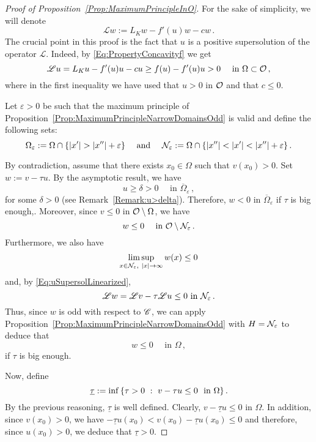 \begin{proof}[Proof of Proposition~\ref{Prop:MaximumPrincipleInO}]
    


	For the sake of simplicity, we will denote 
	$$
	\mathscr{L} w := L_K w - f'(u)w - cw\,.
	$$
	The crucial point in this proof is the fact that $u$ is a positive supersolution of the operator $\mathscr{L}$. Indeed, by \eqref{Eq:PropertyConcavityf} we get
	\begin{equation}
	\label{Eq:uSupersolLinearized}
	\mathscr{L} u = L_K u - f'(u)u - cu \geq f(u) - f'(u)u > 0 \quad \textrm{ in } \Omega \subset \mathcal{O}\,,
	\end{equation}
	where in the first inequality we have used that $u>0$ in $\mathcal{O}$ and that $c\leq 0$.
	
	Let $\varepsilon > 0$ be such that the maximum principle of Proposition~\ref{Prop:MaximumPrincipleNarrowDomainsOdd} is valid and define the following sets:
	$$
	\Omega_\varepsilon := \Omega \cap \{|x'| > |x''| + \varepsilon\}\quad \textrm{ and } \quad 
	\mathcal{N}_\varepsilon := \Omega \cap \{|x''| < |x'| < |x''| + \varepsilon\}\,.
	$$
	
	
    
    By contradiction, assume that there exists $x_0\in \Omega$ such that $v(x_0)> 0$.
	Set $w := v - \tau u$. By the asymptotic result, we have 
	\begin{equation}
		\label{Eq:u>delta}
		u \geq \delta > 0 \quad \textrm{ in } \overline{\Omega}_\varepsilon\,,
	\end{equation}
	for some $\delta >0$ (see Remark~\ref{Remark:u>delta}). Therefore,  $w < 0$ in $\overline{\Omega}_\varepsilon$ if $\tau$ is big enough,. Moreover, since $v\leq 0$ in $\mathcal{O}\setminus\Omega$, we have 
	$$
	w \leq 0 \quad \textrm{ in } \mathcal{O} \setminus \mathcal{N}_\varepsilon\,.
	$$
	Furthermore, we also have
	$$
	\limsup_{x\in \mathcal{N}_\varepsilon, \ |x|\to \infty} w(x) \leq 0
	$$
	and, by \eqref{Eq:uSupersolLinearized},
	$$
	\mathscr{L} w = \mathscr{L} v - \tau \mathscr{L} u \leq 0 \textrm{ in } \mathcal{N}_\varepsilon\,.
	$$
	Thus, since $w$ is odd with respect to $\mathscr{C}$, we can apply Proposition~\ref{Prop:MaximumPrincipleNarrowDomainsOdd} with $H = \mathcal{N}_\varepsilon$ to deduce that
	$$
	w \leq 0 \quad \textrm{ in } \Omega\,,
	$$
	if $\tau$ is big enough.
	
	Now, define 
	$$
	\underline{\tau}:= \inf \left \{ \tau > 0 \ : \ v - \tau u \leq 0 \ \textrm{ in } \Omega \right \}.
	$$
	By the previous reasoning, $\underline{\tau}$ is well defined. Clearly, $v - \underline{\tau} u \leq 0 $ in $\Omega$. In addition, since $v(x_0)>0$, we have $-\underline{\tau} u(x_0) < v(x_0) - \underline{\tau} u (x_0) \leq 0$ and therefore, since $u(x_0)>0$, we deduce that  $\underline{\tau} > 0$.
	

\end{proof}
